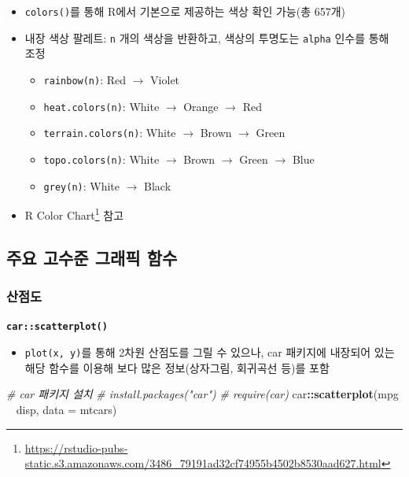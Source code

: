 \documentclass[
  11pt,
]{krantz}
\newenvironment{Shaded}{\begin{snugshade}}{\end{snugshade}}
\newcommand{\CommentTok}[1]{\textcolor[rgb]{0.37,0.37,0.37}{\textit{#1}}}
\newcommand{\DataTypeTok}[1]{\textcolor[rgb]{0.27,0.27,0.27}{#1}}
\newcommand{\KeywordTok}[1]{\textcolor[rgb]{0.27,0.27,0.27}{\textbf{#1}}}
\newcommand{\NormalTok}[1]{#1}
\newcommand{\OperatorTok}[1]{\textcolor[rgb]{0.43,0.43,0.43}{\textbf{#1}}}
\newcommand{\StringTok}[1]{\textcolor[rgb]{0.5,0.5,0.5}{#1}}
\providecommand{\tightlist}{%
  \setlength{\itemsep}{0pt}\setlength{\parskip}{0pt}}
\renewcommand{\href}[2]{#2\footnote{\url{#1}}}
\begin{document}
\normalsize

\begin{itemize}
\tightlist
\item
  \texttt{colors()}를 통해 R에서 기본으로 제공하는 색상 확인 가능(총 657개)
\item
  내장 색상 팔레트: \texttt{n} 개의 색상을 반환하고, 색상의 투명도는 \texttt{alpha} 인수를 통해 조정

  \begin{itemize}
  \tightlist
  \item
    \texttt{rainbow(n)}: Red \(\rightarrow\) Violet
  \item
    \texttt{heat.colors(n)}: White \(\rightarrow\) Orange \(\rightarrow\) Red
  \item
    \texttt{terrain.colors(n)}: White \(\rightarrow\) Brown \(\rightarrow\) Green
  \item
    \texttt{topo.colors(n)}: White \(\rightarrow\) Brown \(\rightarrow\) Green \(\rightarrow\) Blue
  \item
    \texttt{grey(n)}: White \(\rightarrow\) Black
  \end{itemize}
\item
  \href{https://rstudio-pubs-static.s3.amazonaws.com/3486_79191ad32cf74955b4502b8530aad627.html}{R Color Chart} 참고
\end{itemize}

\hypertarget{main-high-level-graph}{%
\subsection{주요 고수준 그래픽 함수}\label{main-high-level-graph}}

\hypertarget{scatter-plot}{%
\subsubsection*{\texorpdfstring{\textbf{산점도}}{산점도}}\label{scatter-plot}}


\textbf{\texttt{car::scatterplot()}}

\begin{itemize}
\tightlist
\item
  \texttt{plot(x,\ y)}를 통해 2차원 산점도를 그릴 수 있으나, car 패키지에 내장되어 있는 해당 함수를 이용해 보다 많은 정보(상자그림, 회귀곡선 등)를 포함
\end{itemize}

\footnotesize

\begin{Shaded}
\begin{Highlighting}[]
\CommentTok{# car 패키지 설치}
\CommentTok{# install.packages("car")}
\CommentTok{# require(car)}
\NormalTok{car}\OperatorTok{::}\KeywordTok{scatterplot}\NormalTok{(mpg }\OperatorTok{~}\StringTok{ }\NormalTok{disp, }\DataTypeTok{data =}\NormalTok{ mtcars)}
\end{Highlighting}
\end{Shaded}
\end{document}
